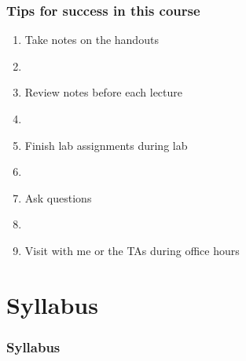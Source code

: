 \documentclass[color=usenames,dvipsnames]{beamer}
\begin{document}
\begin{frame}
  \frametitle{Tips for success in this course}
  \begin{enumerate}[(1)]
    \large
    \item Take notes on the handouts 
    \item[]
    \item Review notes before each lecture 
    \item[]
    \item Finish lab assignments during lab %
    \item[]
    \item Ask questions %
    \item[]
    \item Visit with me or the TAs during office hours %
  \end{enumerate}
\end{frame}



\section{Syllabus}




\begin{frame}
  \frametitle{Syllabus}
  \begin{columns}%
    \begin{column}{0.5\textwidth}
    \end{column}
  \end{columns}
\end{frame}
\end{document}
